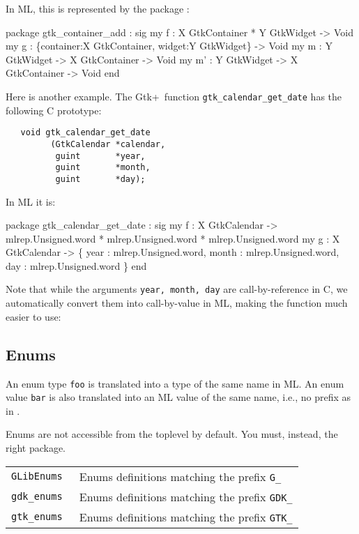 \documentclass{article}
\newcommand{\gtk}{\mbox{\sf Gtk+}}
\begin{document}
   In ML, this is represented by the package :
   \begin{smldisp}
   package gtk_container_add :
   sig
      my f  : X GtkContainer * Y GtkWidget -> Void
      my g  : \{container:X GtkContainer, widget:Y GtkWidget\} -> Void
      my m  : Y GtkWidget -> X GtkContainer -> Void
      my m' : Y GtkWidget -> X GtkContainer -> Void
   end
   \end{smldisp}

   Here is another example.  The \gtk\ function \verb|gtk_calendar_get_date|
has the following C prototype:
\begin{verbatim}
   void gtk_calendar_get_date
         (GtkCalendar *calendar, 
          guint       *year, 
          guint       *month, 
          guint       *day); 
\end{verbatim}

In ML it is:
\begin{smldisp}
   package gtk_calendar_get_date : 
   sig
      my f  : X GtkCalendar -> mlrep.Unsigned.word * 
                                 mlrep.Unsigned.word *
                                 mlrep.Unsigned.word 
      my g  : X GtkCalendar ->
                 \{ year  : mlrep.Unsigned.word,
                   month : mlrep.Unsigned.word,
                   day   : mlrep.Unsigned.word 
                 \}
   end
\end{smldisp}
Note that while the arguments \verb|year, month, day| are call-by-reference
in C, we automatically convert them into call-by-value in ML, making the
function much easier to use:

\subsection{Enums}
      An enum type {\tt foo} is translated into a type of the same
name in ML.  An enum value {\tt bar} is also translated into an ML
value of the same name, i.e., no  prefix as in \mlnlffigen.

Enums are not accessible from the toplevel by default.  You must,
instead,  the right package.
\begin{center}
  \begin{tabular}{|l|l|} \hline
   \tt GLibEnums    & Enums definitions matching the prefix {\tt G\_}  \\
   \tt gdk_enums     & Enums definitions matching the prefix {\tt GDK\_} \\
   \tt gtk_enums     & Enums definitions matching the prefix {\tt GTK\_} \\
\hline
  \end{tabular}
\end{center}
\end{document}
